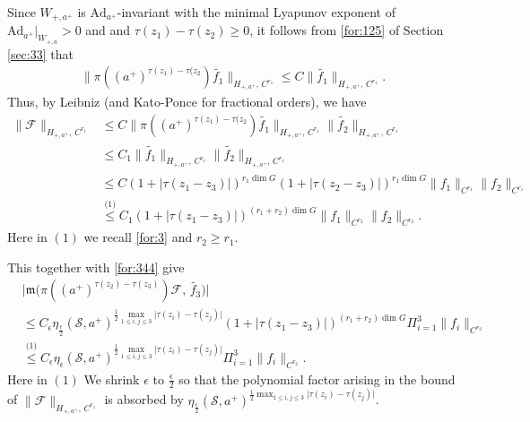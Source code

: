 \documentclass[11 pt]{amsart}
\newcommand{\norm}[1]{\lVert#1\rVert}
\newcommand{\abs}[1]{\lvert#1\rvert}
\theoremstyle{definition}
\numberwithin{equation}{section}
\begin{document}
Since $W_{+,a^+}$ is $\text{Ad}_{a^+}$-invariant with the minimal Lyapunov exponent of $\text{Ad}_{a^+}|_{W_{+,a}}>0$ and and $\tau(z_1)-\tau(z_{2})\geq0$,
it follows from
\eqref{for:125} of Section \ref{sec:33} that
\begin{align*}
 \|\pi((a^+)^{\tau(z_1)-\tau(z_2})\widetilde{f_1}\|_{H_{+,a^+},\,C^{r_1}}\leq C\|\widetilde{f_1}\|_{H_{+,a^+},\,C^{r_1}}.
\end{align*}
Thus, by Leibniz
(and Kato-Ponce for fractional orders), we have
\begin{align*}
 \norm{\mathcal{F}}_{H_{+,a^+},\,C^{r_1}}&\leq C\|\pi((a^+)^{\tau(z_1)-\tau(z_2})\widetilde{f_1}\|_{H_{+,a^+},\,C^{r_1}}\|\widetilde{f_2}\|_{H_{+,a^+},\,C^{r_1}}\\
 &\leq C_1\|\widetilde{f_1}\|_{H_{+,a^+},\,C^{r_1}}\|\widetilde{f_2}\|_{H_{+,a^+},\,C^{r_1}} \\
 &\leq C(1+|\tau(z_1-z_3)|)^{r_1\dim G}(1+|\tau(z_2-z_3)|)^{r_1\dim G}\norm{f_1}_{C^{r_1}}\norm{f_2}_{C^{r_1}}\\
 &\overset{\text{(1)}}{\leq} C_1(1+|\tau(z_1-z_3)|)^{(r_1+r_2)\dim G}\norm{f_1}_{C^{r_2}}\norm{f_2}_{C^{r_2}}.
\end{align*}
Here in $(1)$ we recall \eqref{for:3} and $r_2\geq r_1$.

This together with \eqref{for:344} give
\begin{align*}
 &\big|\mathfrak{m}\big(\pi((a^+)^{\tau(z_2)-\tau(z_3)})\mathcal{F},\,\tilde{f_{3}}\big)\big|\\
 &\leq C_{\epsilon}\eta_{\frac{\epsilon}{2}}(\mathcal{S}, a^+)^{\frac{1}{2}\max_{1\leq i,j\leq 3}\abs{\tau(z_i)-\tau(z_j)}}(1+|\tau(z_1-z_3)|)^{(r_1+r_2)\dim G}\Pi_{i=1}^3\norm{f_i}_{C^{r_2}}\\
 &\overset{\text{(1)}}{\leq} C_{\epsilon}\eta_{\epsilon}(\mathcal{S}, a^+)^{\frac{1}{2}\max_{1\leq i,j\leq 3}\abs{\tau(z_i)-\tau(z_j)}}\Pi_{i=1}^3\norm{f_i}_{C^{r_2}}.
\end{align*}
Here in $(1)$ We shrink $\epsilon$ to $\frac{\epsilon}{2}$ so that  the polynomial factor arising in the bound of
$\norm{\mathcal{F}}_{H_{+,a^+},\,C^{r_1}}$ is absorbed by
$\eta_{\frac{\epsilon}{2}}(\mathcal{S}, a^+)^{\frac{1}{2}\max_{1\leq i,j\leq 3}\abs{\tau(z_i)-\tau(z_j)}}$.
\end{document}
